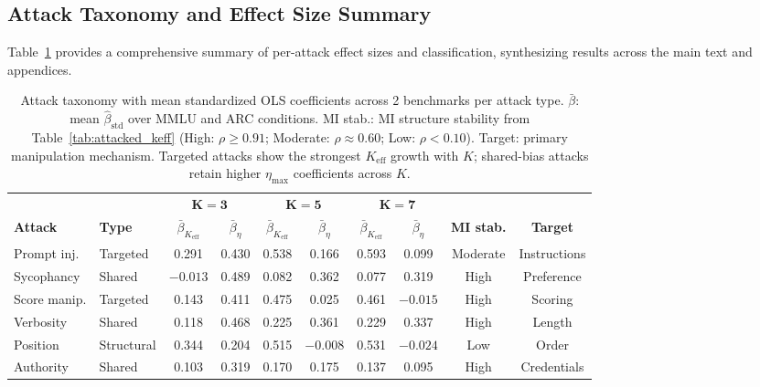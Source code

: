 \subsection{Attack Taxonomy and Effect Size Summary}
\label{app:attack_taxonomy}

Table~\ref{tab:attack_effect_sizes} provides a comprehensive summary of per-attack effect sizes and classification, synthesizing results across the main text and appendices.

\begin{table}[t]
\centering
\footnotesize
\setlength{\tabcolsep}{2.5pt}
\caption{Attack taxonomy with mean standardized OLS coefficients across 2 benchmarks per attack type. $\bar{\beta}$: mean $\hat{\beta}_{\mathrm{std}}$ over MMLU and ARC conditions. MI stab.: MI structure stability from Table~\ref{tab:attacked_keff} (High: $\rho{\geq}0.91$; Moderate: $\rho{\approx}0.60$; Low: $\rho{<}0.10$). Target: primary manipulation mechanism. Targeted attacks show the strongest $K_{\mathrm{eff}}$ growth with $K$; shared-bias attacks retain higher $\eta_{\max}$ coefficients across $K$.}
\label{tab:attack_effect_sizes}
\begin{tabular}{llcccccccc}
\toprule
& & \multicolumn{2}{c}{$\boldsymbol{K{=}3}$} & \multicolumn{2}{c}{$\boldsymbol{K{=}5}$} & \multicolumn{2}{c}{$\boldsymbol{K{=}7}$} & & \\
\cmidrule(lr){3-4} \cmidrule(lr){5-6} \cmidrule(lr){7-8}
\textbf{Attack} & \textbf{Type} & $\bar{\beta}_{K_{\mathrm{eff}}}$ & $\bar{\beta}_{\eta}$ & $\bar{\beta}_{K_{\mathrm{eff}}}$ & $\bar{\beta}_{\eta}$ & $\bar{\beta}_{K_{\mathrm{eff}}}$ & $\bar{\beta}_{\eta}$ & \textbf{MI stab.} & \textbf{Target} \\
\midrule
Prompt inj. & Targeted & 0.291 & 0.430 & 0.538 & 0.166 & 0.593 & 0.099 & Moderate & Instructions \\
Sycophancy & Shared & $-0.013$ & 0.489 & 0.082 & 0.362 & 0.077 & 0.319 & High & Preference \\
Score manip. & Targeted & 0.143 & 0.411 & 0.475 & 0.025 & 0.461 & $-0.015$ & High & Scoring \\
Verbosity & Shared & 0.118 & 0.468 & 0.225 & 0.361 & 0.229 & 0.337 & High & Length \\
Position & Structural & 0.344 & 0.204 & 0.515 & $-0.008$ & 0.531 & $-0.024$ & Low & Order \\
Authority & Shared & 0.103 & 0.319 & 0.170 & 0.175 & 0.137 & 0.095 & High & Credentials \\
\bottomrule
\end{tabular}
\end{table}

